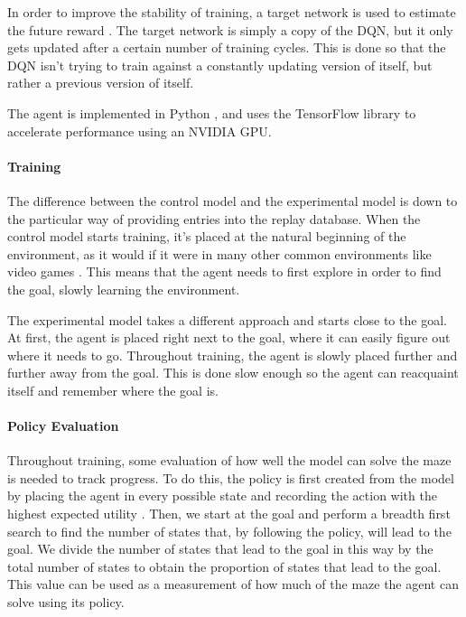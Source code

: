 \documentclass[12pt]{article}
\begin{document}
In order to improve the stability of training, a target network is used to estimate the future reward \cite{article_human_level_control_deep_reinforcement_learning}.
The target network is simply a copy of the DQN, but it only gets updated after a certain number of training cycles.
This is done so that the DQN isn't trying to train against a constantly updating version of itself, but rather a previous version of itself.

The agent is implemented in Python \cite{lang_python}, and uses the TensorFlow \cite{lib_tensorflow} library to accelerate performance using an NVIDIA GPU.


\paragraph{Training} 
The difference between the control model and the experimental model is down to the particular way of providing entries into the replay database.
When the control model starts training, it's placed at the natural beginning of the environment, as it would if it were in many other common environments like video games \cite{article_reinforcement_learning_survey}.
This means that the agent needs to first explore in order to find the goal, slowly learning the environment.

The experimental model takes a different approach and starts close to the goal.
At first, the agent is placed right next to the goal, where it can easily figure out where it needs to go.
Throughout training, the agent is slowly placed further and further away from the goal.
This is done slow enough so the agent can reacquaint itself and remember where the goal is.


\paragraph{Policy Evaluation}

Throughout training, some evaluation of how well the model can solve the maze is needed to track progress.
To do this, the policy is first created from the model by placing the agent in every possible state and recording the action with the highest expected utility \cite{article_reinforcement_learning_survey}.
Then, we start at the goal and perform a breadth first search to find the number of states that, by following the policy, will lead to the goal.
We divide the number of states that lead to the goal in this way by the total number of states to obtain the proportion of states that lead to the goal.
This value can be used as a measurement of how much of the maze the agent can solve using its policy.
\end{document}
